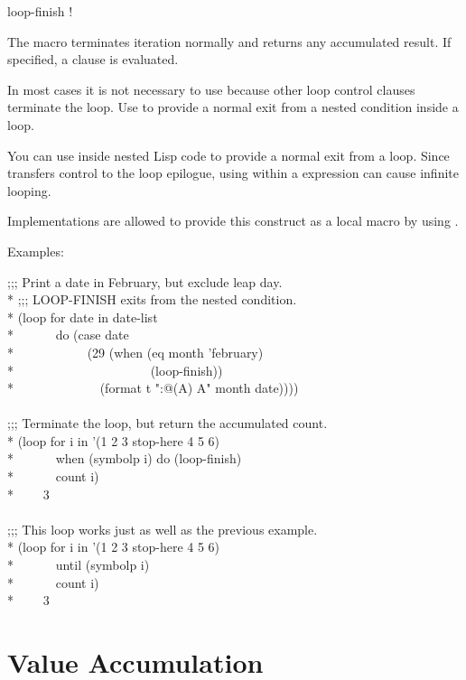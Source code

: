 \begin{defmac}
loop-finish \!!

The macro  terminates iteration normally
and returns any accumulated result.  If specified, a  clause
is evaluated.

In most cases it is not necessary to use 
because other loop control clauses terminate the loop.  
Use  to provide a normal exit
from a nested condition inside a loop.

You can use 
inside nested Lisp code to provide a normal exit from a loop.
Since  transfers control to the loop epilogue,
using  within a  expression can cause
infinite looping.

Implementations are allowed to provide this construct as a local macro
by using .

Examples:
\begin{lisp}
;;; Print a date in February, but exclude leap day. \\*
;;; LOOP-FINISH exits from the nested condition. \\*
(loop for date in date-list \\*
~~~~~~do (case date \\*
~~~~~~~~~~~(29 (when (eq month 'february) \\*
~~~~~~~~~~~~~~~~~~~~~(loop-finish)) \\*
~~~~~~~~~~~~~(format t "{\Xtilde}:@({\Xtilde}A{\Xtilde}) {\Xtilde}A" month date)))) \\
 \\
;;; Terminate the loop, but return the accumulated count. \\*
(loop for i in '(1 2 3 stop-here 4 5 6) \\*
~~~~~~when (symbolp i) do (loop-finish) \\*
~~~~~~count i) \\*
~~~\EV~3 \\
 \\
;;; This loop works just as well as the previous example. \\*
(loop for i in '(1 2 3 stop-here 4 5 6) \\*
~~~~~~until (symbolp i) \\*
~~~~~~count i) \\*
~~~\EV~3
\end{lisp}
\end{defmac}

\section{Value Accumulation}
\label{LOOP-ACCUM-SECTION}

